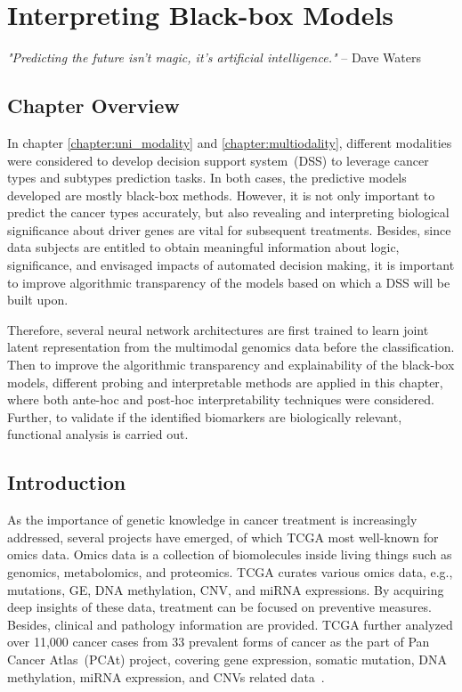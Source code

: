 \chapter{Interpreting Black-box Models}\label{chapter:xai}

\textit{"Predicting the future isn't magic, it's artificial intelligence."} -- Dave Waters 

\section{Chapter Overview}
In chapter \ref{chapter:uni_modality} and \ref{chapter:multiodality}, different modalities were considered to develop decision support system~(DSS) to leverage cancer types and subtypes prediction tasks. In both cases, the predictive models developed are mostly black-box methods. However, it is not only important to predict the cancer types accurately, but also revealing and interpreting biological significance about driver genes are vital for subsequent treatments. 
Besides, since data subjects are entitled to obtain meaningful information about logic, significance, and envisaged impacts of automated decision making, it is important to improve algorithmic transparency of the models based on which a DSS will be built upon. 

\hspace*{3.5mm} Therefore, several neural network architectures are first trained to learn joint latent representation from the multimodal genomics data before the classification. Then to improve the algorithmic transparency and explainability of the black-box models, different probing and interpretable methods are applied in this chapter, where both ante-hoc and post-hoc interpretability techniques were considered. Further, to validate if the identified biomarkers are biologically relevant, functional analysis is carried out. 

\section{Introduction}\label{chapter_5:intro}
As the importance of genetic knowledge in cancer treatment is increasingly addressed, several projects have emerged, of which TCGA most well-known for omics data. Omics data is a collection of biomolecules inside living things such as genomics, metabolomics, and proteomics. TCGA curates various omics data, e.g., mutations, GE, DNA methylation, CNV, and miRNA expressions. By acquiring deep insights of these data, treatment can be focused on preventive measures. Besides, clinical and pathology information are provided. TCGA further analyzed over 11,000 cancer cases from 33 prevalent forms of cancer as the part of Pan Cancer Atlas~(PCAt) project, covering gene expression, somatic mutation, DNA methylation, miRNA expression, and CNVs related data~\cite{lyu2018deep}. 

